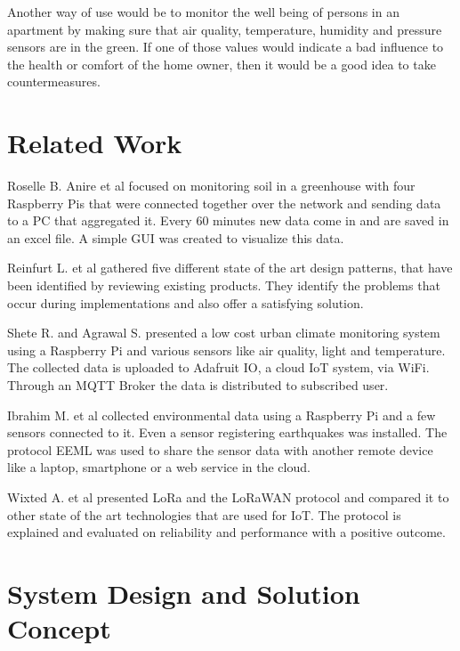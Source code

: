 \documentclass[bachelorthesis, grey, english]{mas-thesis-chapters} %
\begin{document}
Another way of use would be to monitor the well being of persons in an apartment by making sure that air quality, temperature, humidity and pressure sensors are in the green. If one of those values would indicate a bad influence to the health or comfort of the home owner, then it would be a good idea to take countermeasures.

\section{Related Work}

Roselle B. Anire et al \cite{raspNet} focused on monitoring soil in a greenhouse with four Raspberry Pis that were connected together over the network and sending data to a PC that aggregated it. Every 60 minutes new data come in and are saved in an excel file. A simple \gls{GUI} was created to visualize this data.

Reinfurt L. et al \cite{iotPatterns} gathered five different state of the art design patterns, that have been identified by reviewing existing products. They identify the problems that occur during implementations and also offer a satisfying solution. 

Shete R. and Agrawal S. \cite{urbanRasp} presented a low cost urban climate monitoring system using a Raspberry Pi and various sensors like air quality, light and temperature. The collected data is uploaded to Adafruit IO, a cloud \gls{IoT} system, via WiFi. Through an MQTT Broker the data is distributed to subscribed user.

Ibrahim M. et al \cite{smartEnv} collected environmental data using a Raspberry Pi and a few sensors connected to it. Even a sensor registering earthquakes was installed. The protocol \gls{EEML} was used to share the sensor data with another remote device like a laptop, smartphone or a web service in the cloud. 

Wixted A. et al \cite{loraEval} presented LoRa and the LoRaWAN protocol and compared it to other state of the art technologies that are used for \gls{IoT}. The protocol is explained and evaluated on reliability and performance with a positive outcome. 

\section{System Design and Solution Concept}
\end{document}
